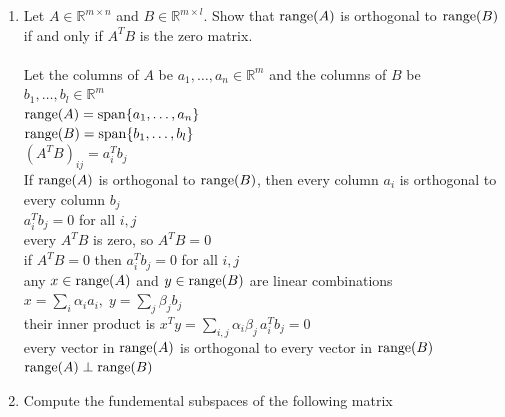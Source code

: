 \documentclass{article}
\begin{document}
{{\begin{enumerate}
\newpage\item Let $A\in\mathbb{R}^{m\times n}$ and $B\in\mathbb{R}^{m\times l}$. Show that ${\rm range}(A)$ is orthogonal to ${\rm range}(B)$ if and only if $A^TB$ is the zero matrix.
\\
\\Let the columns of $A$ be $a_1,\dots,a_n\in\mathbb R^m$ and the columns of $B$ be $b_1,\dots,b_l\in\mathbb R^m$
\\${\rm range}(A)=\operatorname{span}\{a_1,\dots,a_n\}$
\\${\rm range}(B)=\operatorname{span}\{b_1,\dots,b_l\}$
\\$(A^TB)_{ij}=a_i^T b_j$
\\If ${\rm range}(A)$ is orthogonal to ${\rm range}(B)$, then every column $a_i$ is orthogonal to every column $b_j$
\\$a_i^T b_j=0$ for all $i,j$
\\every $A^TB$ is zero, so $A^TB=0$
\\if $A^TB=0$ then $a_i^T b_j=0$ for all $i,j$
\\any $x\in{\rm range}(A)$ and $y\in{\rm range}(B)$ are linear combinations $x=\sum_i \alpha_i a_i,\; y=\sum_j \beta_j b_j$
\\their inner product is $x^Ty=\sum_{i,j}\alpha_i\beta_j\,a_i^T b_j=0$
\\every vector in ${\rm range}(A)$ is orthogonal to every vector in ${\rm range}(B)$
\\${\rm range}(A)\perp{\rm range}(B)$

\newpage\item Compute the fundemental subspaces of the following matrix


\end{enumerate}}}
\end{document}
